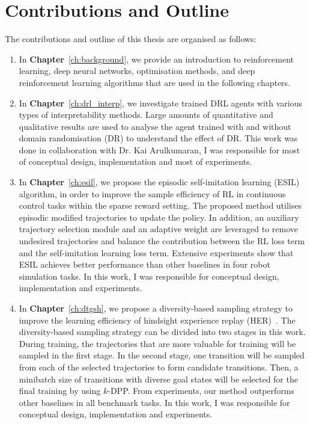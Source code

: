 \section{Contributions and Outline}
The contributions and outline of this thesis are organised as follows:
\begin{enumerate}
    \item In \textbf{Chapter}~\ref{ch:background}, we provide an introduction to reinforcement learning, deep neural networks, optimisation methods, and deep reinforcement learning algorithms that are used in the following chapters.
    
    \item In \textbf{Chapter}~\ref{ch:drl_interp}, we investigate trained DRL agents with various types of interpretability methods. Large amounts of quantitative and qualitative results are used to analyse the agent trained with and without domain randomisation (DR) to understand the effect of DR. This work was done in collaboration with Dr. Kai Arulkumaran, I was responsible for most of conceptual design, implementation and most of experiments.
   
    \item In \textbf{Chapter}~\ref{ch:esil}, we propose the episodic self-imitation learning (ESIL) algorithm, in order to improve the sample efficiency of RL in continuous control tasks within the sparse reward setting. The proposed method utilises episodic modified trajectories to update the policy. In addition, an auxiliary trajectory selection module and an adaptive weight are leveraged to remove undesired trajectories and balance the contribution between the RL loss term and the self-imitation learning loss term. Extensive experiments show that ESIL achieves better performance than other baselines in four robot simulation tasks. In this work, I was responsible for conceptual design, implementation and experiments.
    
    \item In \textbf{Chapter}~\ref{ch:dtgsh}, we propose a diversity-based sampling strategy to improve the learning efficiency of hindsight experience replay (HER)~\cite{andrychowicz2017hindsight}. The diversity-based sampling strategy can be divided into two stages in this work. During training, the trajectories that are more valuable for training will be sampled in the first stage. In the second stage, one transition will be sampled from each of the selected trajectories to form candidate transitions. Then, a minibatch size of transitions with diverse goal states will be selected for the final training by using $k$-DPP. From experiments, our method outperforms other baselines in all benchmark tasks. In this work, I was responsible for conceptual design, implementation and experiments.
    

\end{enumerate}
